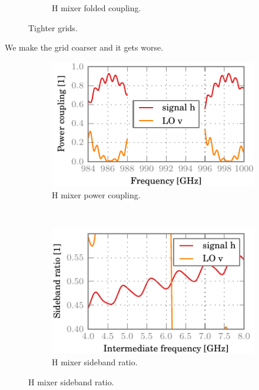 \begin{figure}[hbtp]
\begin{subfigure}[b]{.5\textwidth}
        \caption{H mixer folded coupling.}
    \end{subfigure}%
    \caption{Tighter grids.}
    \label{fig:06_tighter}
\end{figure}

We make the grid coarser and it gets worse.

\begin{figure}[hbtp]
    \centering
    \begin{subfigure}[b]{.5\textwidth}
        \includegraphics{chapter_3/07_looser_h_dsb}%
        \caption{H mixer power coupling.}
    \end{subfigure}%
    \\
    \begin{subfigure}[b]{.5\textwidth}
        \includegraphics{chapter_3/07_looser_h_sbr}%
        \caption{H mixer sideband ratio.}
    \end{subfigure}%

\end{figure}
